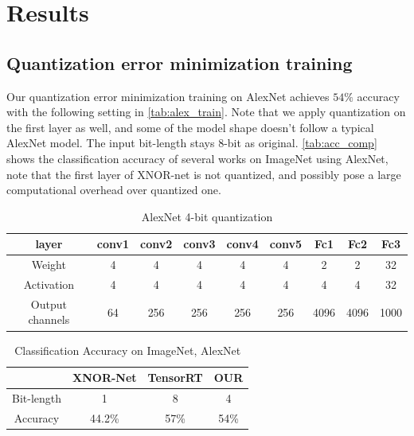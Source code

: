 \chapter{Results}
\label{ch:results}
\section{Quantization error minimization training}
Our quantization error minimization training on AlexNet achieves $54\%$ accuracy with the following setting in \autoref{tab:alex_train}. Note that we apply quantization on the first layer as well, and some of the model shape doesn't follow a typical AlexNet model. The input bit-length stays 8-bit as original. \autoref{tab:acc_comp} shows the classification accuracy of several works on ImageNet using AlexNet, note that the first layer of XNOR-net is not quantized, and possibly pose a large computational overhead over quantized one. 
\begin{table}[h]
    \caption{AlexNet 4-bit quantization}
    \label{tab:alex_train}
    \centering
    \footnotesize 
        \begin{tabular}{c|cccccccc}
        \toprule
        layer & conv1 & conv2 & conv3 & conv4 & conv5 & Fc1 & Fc2 & Fc3\\
        \midrule
        Weight & 4 & 4 & 4 & 4 & 4 & 2 & 2 & 32 \\
        Activation & 4 & 4 & 4 & 4 & 4 & 4 & 4 &32\\
        Output channels & 64 & 256 & 256 & 256 & 256 & 4096 & 4096 & 1000\\
        \bottomrule
        \end{tabular}
\end{table}
\begin{table}[h]
    \caption{Classification Accuracy on ImageNet, AlexNet}
    \label{tab:acc_comp}
    \centering
    \footnotesize 
        \begin{tabular}{c|c|c|c|}
        \toprule
        &XNOR-Net\cite{XnorNet} & TensorRT\cite{TensorRT8bit} & OUR\\ 
        \midrule
        Bit-length & 1& 8 & 4 \\
        Accuracy & 44.2\% & 57\% & 54\%\\
        \bottomrule
        \end{tabular}
\end{table}
